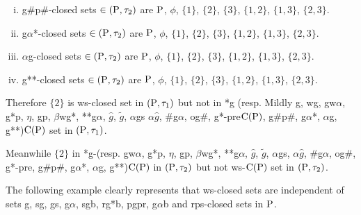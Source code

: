 \begin{exm}
\begin{enumerate}[(i)]
\item g\#p\#-closed sets $\in(\mathrm{P}, \tau_{2})$ are $\mathrm{P}$, $\phi$, $\{1\}$, $\{2\}$, $\{3\}$, $\{1, 2\}$, $\{1, 3\}$, $\{2, 3\}$.
\item g$\alpha$*-closed sets $\in(\mathrm{P}, \tau_{2})$ are $\mathrm{P}$, $\phi$, $\{1\}$, $\{2\}$, $\{3\}$, $\{1, 2\}$, $\{1, 3\}$, $\{2, 3\}$.
\item $\alpha$g-closed sets $\in(\mathrm{P}, \tau_{2})$ are $\mathrm{P}$, $\phi$, $\{1\}$, $\{2\}$, $\{3\}$, $\{1, 2\}$, $\{1, 3\}$, $\{2, 3\}$.
\item g{*}{*}-closed sets $\in(\mathrm{P}, \tau_{2})$ are $\mathrm{P}$, $\phi$, $\{1\}$, $\{2\}$, $\{3\}$, $\{1, 2\}$, $\{1, 3\}$, $\{2, 3\}$.
\end{enumerate}

Therefore $\{2\}$ is ws-closed set in $(\mathrm{P}, \tau_{1})$ but not in *g (resp. Mildly g, wg, gw$\alpha$, g*p, $\eta$, gp, $\beta$wg*, {*}{*}g$\alpha$, $\hat{g}$, $\tilde{g}$, $\alpha$gs $\alpha\hat{g}$, \#g$\alpha$, og\#, g*-pre$\mathrm{C}(\mathrm{P})$, g\#p\#, g$\alpha$*, $\alpha$g, g{*}{*})$\mathrm{C}(\mathrm{P})$ set in $(\mathrm{P},\tau_{1})$.

Meanwhile $\{2\}$ in *g-(resp. gw$\alpha$, g*p, $\eta$, gp, $\beta$wg*, {*}{*}g$\alpha$, $\hat{g}$, $\tilde{g}$, $\alpha$gs, $\alpha\hat{g}$, \#g$\alpha$, og\#, g*-pre, g\#p\#, g$\alpha$*, $\alpha$g, g{*}{*})$\mathrm{C}(\mathrm{P})$ in $(\mathrm{P}, \tau_{2})$ but not ws-$\mathrm{C}(\mathrm{P})$ set in $(\mathrm{P}, \tau_{2})$.
\end{exm}

\begin{rem}\label{rem2.2.18}
The following example clearly represents that ws-closed sets are independent of sets g, sg, gs, g$\alpha$, sgb, rg*b, pgpr, g$\alpha$b and rps-closed sets in $\mathrm{P}$.
\end{rem}

